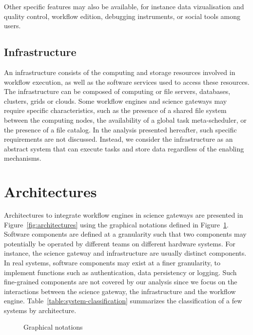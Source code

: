 \documentclass[preprint,3p,twocolumn]{elsarticle}
\newcommand{\correction}[1]{\color{blue}#1\color{black}\xspace}
\begin{document}
Other specific features may also be available, for instance
data vizualisation and quality control, workflow edition, debugging
instruments, or social tools among users. 

\subsection{Infrastructure}

An infrastructure consists of the computing and storage
resources involved in workflow execution, as well as the software
services used to access these resources. The infrastructure can be
composed of computing or file servers, databases, clusters, grids or
clouds. Some workflow engines and science gateways may require specific
characteristics, such as the presence of a shared file system between
the computing nodes, the availability of a global task meta-scheduler, or
the presence of a file catalog. In the analysis presented hereafter,
such specific requirements are not discussed. Instead, we consider the
infrastructure as an abstract system that can execute tasks and store
data regardless of the enabling mechanisms.

\section{Architectures}
\label{sec:architectures}


Architectures to integrate workflow engines in science gateways are
presented in Figure~\ref{fig:architectures} using the graphical
notations defined in Figure~\ref{fig:notations}. \correction{Software
  components are defined at a granularity such that two components may
  potentially be operated by different teams on different hardware
  systems. For instance, the science gateway and infrastructure are
  usually distinct components. In real systems, software components
  may exist at a finer granularity, to implement functions such as
  authentication, data persistency or logging. Such fine-grained
  components are not covered by our analysis since we focus on the
  interactions between the science gateway, the infrastructure and the
  workflow engine.}  Table~\ref{table:system-classification}
summarizes the classification of a few systems by architecture.


\begin{figure}
\centering
\def\svgwidth{0.8\columnwidth}

\caption{Graphical notations}
\label{fig:notations}
\end{figure}
\end{document}

